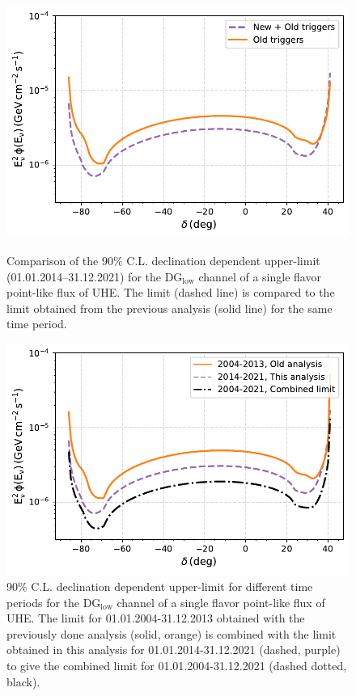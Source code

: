 \begin{figure}[th!]
  \centering
  \includegraphics[width=\textwidth]{thesis_figures/PointLimits/Point_comp_new_old.pdf}
  \caption{Comparison of the 90\% C.L. declination dependent upper-limit (01.01.2014–31.12.2021) for the DG$_{\text{low}}$ channel of a single flavor point-like flux of UHE. The limit (dashed line) is compared to the limit obtained from the previous analysis (solid line) for the same time period.}
  \label{fig:Dec_limit_new old}
  \includegraphics[width=14.5cm]{thesis_figures/PointLimits/Point_comp_combined.pdf}
  \caption{90\% C.L. declination dependent upper-limit for different time periods for the DG$_{\text{low}}$ channel of a single flavor point-like flux of UHE. The limit for 01.01.2004-31.12.2013 obtained with the previously done analysis (solid, orange) is combined with the limit obtained in this analysis for 01.01.2014-31.12.2021 (dashed, purple) to give the combined limit for 01.01.2004-31.12.2021 (dashed dotted, black).}
  \label{fig:Dec_limit_comb1}
\end{figure}

